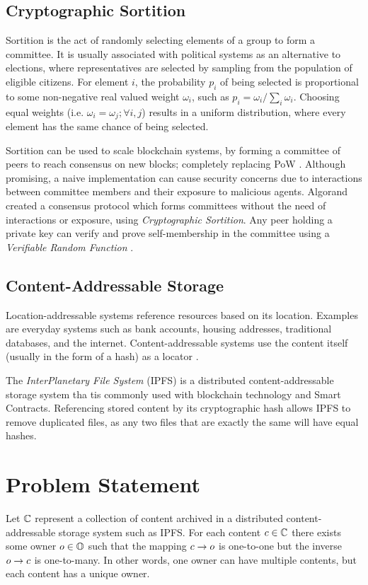 \documentclass[conference]{IEEEtran}
\begin{document}
\subsection{Cryptographic Sortition}
Sortition is the act of randomly selecting elements of a group to form a committee. It is usually associated with political systems as an alternative to elections, where representatives are selected by sampling from the population of eligible citizens. For element $i$, the probability $p_i$ of being selected is proportional to some non-negative real valued weight $\omega_i$, such as $p_i = \omega_i/\sum_i\omega_i$. Choosing equal weights (i.e. $\omega_i = \omega_j; \forall i,j$) results in a uniform distribution, where every element has the same chance of being selected.

Sortition can be used to scale blockchain systems, by forming a committee of peers to reach consensus on new blocks; completely replacing PoW \cite{gilad2017algorand}. Although promising, a naive implementation can cause security concerns due to interactions between committee members and their exposure to malicious agents. Algorand \cite{gilad2017algorand} created a consensus protocol which forms committees without the need of interactions or exposure, using \emph{Cryptographic Sortition}. Any peer holding a private key can verify and prove self-membership in the committee using a \emph{Verifiable Random Function} \cite{micali1999verifiable}.

\subsection{Content-Addressable Storage}
Location-addressable systems reference resources based on its location. Examples are everyday systems such as bank accounts, housing addresses, traditional databases, and the internet. Content-addressable systems use the content itself (usually in the form of a hash) as a locator \cite{atkin2010system}.

The \emph{InterPlanetary File System} (IPFS) \cite{benet2014ipfs} is a distributed content-addressable storage system tha tis commonly used with blockchain technology and Smart Contracts. Referencing stored content by its cryptographic hash allows IPFS to remove duplicated files, as any two files that are exactly the same will have equal hashes.
\section{Problem Statement}
Let ${{\mathbb{C}}}$ represent a collection of content archived in a distributed content-addressable storage system such as IPFS. For each content ${c} \in {{\mathbb{C}}}$ there exists some owner ${o} \in {{\mathbb{O}}}$ such that the mapping ${c} \to {o}$ is one-to-one but the inverse ${o} \to {c}$ is one-to-many. In other words, one owner can have multiple contents, but each content has a unique owner. 
\end{document}
